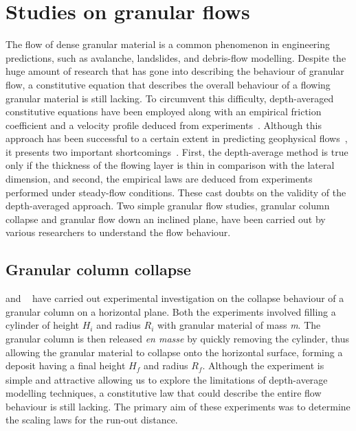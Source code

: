 \section{Studies on granular flows}
The flow of dense granular material is a common phenomenon in engineering 
predictions, such as avalanche, landslides, and debris-flow modelling. Despite 
the huge amount of research that has gone into describing the behaviour of 
granular flow, a constitutive equation that describes the overall behaviour of 
a flowing granular material is still lacking. To circumvent this difficulty, 
depth-averaged constitutive equations have been employed along with an 
empirical friction coefficient and a velocity profile deduced from 
experiments~\citep{Midi2004,Iverson2003,Pouliquen1999}. Although this approach 
has been successful to a certain extent in predicting geophysical 
flows~\citep{Pouliquen2002a, Hutter1995}, it presents two important 
shortcomings~\citep{Lajeunesse2005}. First, the depth-average method is true 
only if the thickness of the flowing layer is thin in comparison with the 
lateral dimension, and second, the empirical laws are deduced from experiments 
performed under steady-flow conditions. These cast doubts on the validity of 
the depth-averaged approach. Two simple granular flow studies, granular column 
collapse and granular flow down an inclined plane, have been carried out by 
various researchers to understand the flow behaviour.

\subsection{Granular column collapse}
\citet{Lube2005} and ~\citet{Lajeunesse2004} have carried out experimental 
investigation on the collapse behaviour of a granular column on a horizontal 
plane. Both the experiments involved filling a cylinder of height 
$\textit{H}_{\textit{i}}$ and radius $\textit{R}_{\textit{i}}$ with granular 
material of mass \textit{m}. The granular column is then released \textit{en 
masse} by quickly removing the cylinder, thus allowing the granular material to 
collapse onto the horizontal surface, forming a deposit having a final height 
$\textit{H}_{\textit{f}}$ and radius $\textit{R}_{\textit{f}}$. Although the 
experiment is simple and attractive allowing us to explore the limitations of 
depth-average modelling techniques, a constitutive law that could describe the 
entire flow behaviour is still lacking. The primary aim of these experiments 
was to determine the scaling laws for the run-out distance.

